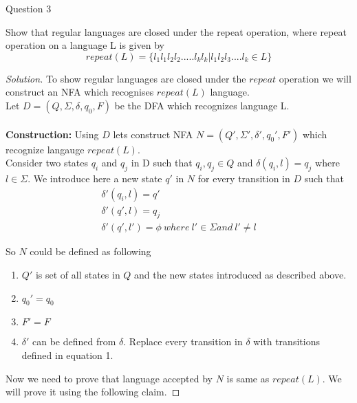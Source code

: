 \begin{solution}{Question 3}\label{ques:3}
    \begin{question}
    Show that regular languages are closed under the repeat operation, where repeat operation
    on a language L is given by
    \[
        repeat(L) = \{l_1 l_1 l_2 l_2 ..... l_k l_k | l_1 l_2 l_3....l_k \in L\}
    \]
    \end{question}
    \tcblower{}
    \begin{proof}[Solution]
        To show regular languages are closed under the $repeat$ operation we will construct an NFA which recognises $repeat(L)$ language.
        \\
        Let $D = (Q, \Sigma, \delta, q_0, F)$ be the DFA which recognizes language L.
        \\
        \\
        \textbf{Construction:} Using $D$ lets construct NFA $N = (Q', \Sigma', \delta', q_0', F')$ which recognize langauge $repeat(L)$.\\
        Consider two states $q_i$ and $q_j$ in D such that $q_i, q_j \in Q$ and $\delta(q_i, l) = q_j$ where $l \in \Sigma$. We introduce here a new state $q'$ in $N$ for every transition in $D$ such that 
        \begin{equation}
            \begin{split}
                \delta'(q_i, l) = q' \\
                \delta'(q', l) = q_j \\
                \delta'(q', l') = \phi\ where\ l' \in \Sigma and\ l' \neq l
            \end{split}
        \end{equation}
        
        So $N$ could be defined as following
        \begin{enumerate}
            \item $Q'$ is set of all states in $Q$ and the new states introduced as described above.
            \item $q_0' = q_0$
            \item $F' = F$
            \item $\delta'$ can be defined from $\delta$. Replace every transition in $\delta$ with transitions defined in equation 1. 
        \end{enumerate}
        
        Now we need to prove that language accepted by $N$ is same as $repeat(L)$. We will prove it using the following claim.
        

\end{proof}
\end{solution}
